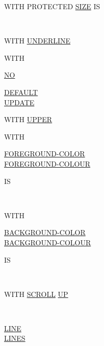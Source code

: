 \documentclass[a4paper,oneside,svgnames]{scrbook}
\makeatletter
\newcommand{\key}[1]{\underline{#1}}
\newcommand{\miscext}[1]{%
  \colorbox{blue!50}{#1}}
\newenvironment{0-1}{$\left[ \begin{tabular}{@{}l@{}}}{\end{tabular} \right]$}
\newenvironment{1=}{$\left\{ \begin{tabular}{@{}l@{}}}{\end{tabular} \right\}$}
\makeatother
\begin{document}
\begin{0-1}
  WITH \miscext{PROTECTED} \key{SIZE} IS
  \begin{1=}
    \identifier \\
    \integer
  \end{1=}
\end{0-1}

\begin{0-1}
WITH \key{UNDERLINE}
\end{0-1}


\begin{0-1}
  WITH
  \begin{0-1}
    \key{NO}
  \end{0-1}
  \begin{1=}
    \key{DEFAULT} \\
    \key{UPDATE}
  \end{1=}
\end{0-1}

\begin{0-1}
WITH \key{UPPER}
\end{0-1}


\begin{0-1}
  WITH
  \begin{1=}
    \key{FOREGROUND-COLOR} \\
    \key{FOREGROUND-COLOUR}
  \end{1=}
  IS
  \begin{1=}
    \identifier \\
    \integer
  \end{1=}
\end{0-1}

\begin{0-1}
  WITH
  \begin{1=}
    \key{BACKGROUND-COLOR} \\
    \key{BACKGROUND-COLOUR}
  \end{1=}
  IS
  \begin{1=}
    \identifier \\
    \integer
  \end{1=}
\end{0-1}

\begin{0-1}
  WITH \key{SCROLL} \key{UP}
  \begin{0-1}
    \identifier \\
    \integer
  \end{0-1}
  \begin{1=}
    \key{LINE} \\
    \key{LINES}
  \end{1=}
\end{0-1}
\end{document}
